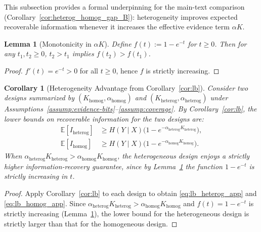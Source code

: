 \documentclass{article}
\theoremstyle{plain}
\newtheorem{lemma}[theorem]{Lemma}
\newtheorem{corollary}[theorem]{Corollary}
\theoremstyle{definition}
\theoremstyle{remark}
\newcommand{\EE}{\mathbb{E}}
\begin{document}
This subsection provides a formal underpinning for the main-text comparison
(Corollary~\ref{cor:heterog_homog_gap_B}): heterogeneity improves expected recoverable information whenever it increases
the effective evidence term $\alpha K$.

\begin{lemma}[Monotonicity in $\alpha K$]
\label{lem:monotone_alphaK}
Define $f(t):=1-e^{-t}$ for $t\ge 0$.
Then for any $t_1,t_2\ge 0$, $t_2>t_1$ implies $f(t_2)>f(t_1)$.
\end{lemma}

\begin{proof}
$f'(t)=e^{-t}>0$ for all $t\ge 0$, hence $f$ is strictly increasing.
\end{proof}

\begin{corollary}[Heterogeneity Advantage from Corollary~\ref{cor:lb}]
\label{cor:heterog_homog_gap}
Consider two designs summarized by $(K_{\mathrm{homog}},\alpha_{\mathrm{homog}})$ and $(K_{\mathrm{heterog}},\alpha_{\mathrm{heterog}})$
under Assumptions~\ref{assump:evidence-bits}--\ref{assump:coverage}.
By Corollary~\ref{cor:lb}, the lower bounds on recoverable information for the two designs are:
\begin{align}
\EE[I_{\mathrm{heterog}}]
&\ge H(Y\mid X)\bigl(1-e^{-\alpha_{\mathrm{heterog}}K_{\mathrm{heterog}}}\bigr), \label{eq:lb_heterog_app}\\
\EE[I_{\mathrm{homog}}]
&\ge H(Y\mid X)\bigl(1-e^{-\alpha_{\mathrm{homog}}K_{\mathrm{homog}}}\bigr). \label{eq:lb_homog_app}
\end{align}
When $\alpha_{\mathrm{heterog}}K_{\mathrm{heterog}}>\alpha_{\mathrm{homog}}K_{\mathrm{homog}}$, the heterogeneous design enjoys a strictly higher information-recovery guarantee, since by Lemma~\ref{lem:monotone_alphaK} the function $1-e^{-t}$ is strictly increasing in $t$.
\end{corollary}

\begin{proof}
Apply Corollary~\ref{cor:lb} to each design to obtain \eqref{eq:lb_heterog_app} and \eqref{eq:lb_homog_app}.
Since $\alpha_{\mathrm{heterog}}K_{\mathrm{heterog}}>\alpha_{\mathrm{homog}}K_{\mathrm{homog}}$ and $f(t)=1-e^{-t}$ is strictly increasing (Lemma~\ref{lem:monotone_alphaK}), the lower bound for the heterogeneous design is strictly larger than that for the homogeneous design.
\end{proof}

\end{document}

